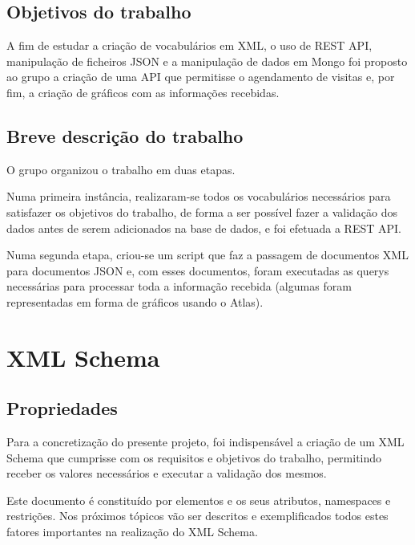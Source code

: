 \documentclass{article}
\begin{document}
\subsection{Objetivos do trabalho}
\hspace{0.5cm}A fim de estudar a criação de vocabulários em XML, o uso de REST API, manipulação de ficheiros JSON e a manipulação de dados em Mongo foi proposto ao grupo a criação de uma API que permitisse o agendamento de visitas e, por fim, a criação de gráficos com as informações recebidas. \par

\subsection{Breve descrição do trabalho}
\hspace{0.5cm}O grupo organizou o trabalho em duas etapas.\par
Numa primeira instância, realizaram-se todos os vocabulários necessários para satisfazer os objetivos do trabalho, de forma a ser possível fazer a validação dos dados antes de serem adicionados na base de dados, e foi efetuada a REST API. \par
Numa segunda etapa, criou-se um script que faz a passagem de documentos XML para documentos JSON e, com esses documentos, foram executadas as querys necessárias para processar toda a informação recebida (algumas foram representadas em forma de gráficos usando o Atlas).  \par

\newpage
\section{XML Schema}
\subsection{Propriedades}
\hspace{0.5cm} Para a concretização do presente projeto, foi indispensável a criação de um XML Schema que cumprisse com os requisitos e objetivos do trabalho, permitindo receber os valores necessários e executar a validação dos mesmos. \par
Este documento é constituído por elementos e os seus atributos, namespaces e restrições. Nos próximos tópicos vão ser descritos e exemplificados todos estes fatores importantes na realização do XML Schema. 
\end{document}
